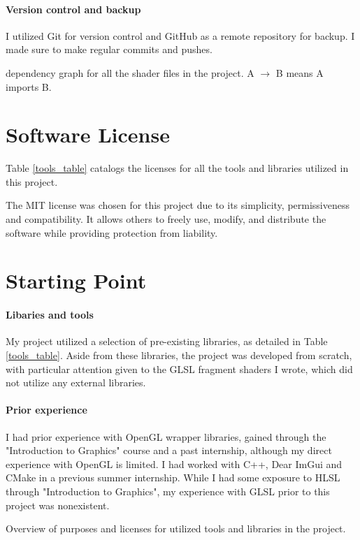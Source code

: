 \paragraph{Version control and backup}
I utilized Git for version control and GitHub as a remote repository for backup. I made sure to make regular commits and pushes.

{dependency graph for all the shader files in the project. A $\rightarrow$ B means A imports B.}

\section{Software License}
\label{sec:License}

Table \ref{tools_table} catalogs the licenses for all the tools and libraries utilized in this project.

The MIT license was chosen for this project due to its simplicity, permissiveness and compatibility. It allows others to freely use, modify, and distribute the software while providing protection from liability.


\section{Starting Point}
\label{sec:Starting Point}

\paragraph{Libaries and tools}
My project utilized a selection of pre-existing libraries, as detailed in Table \ref{tools_table}. Aside from these libraries, the project was developed from scratch, with particular attention given to the GLSL fragment shaders I wrote, which did not utilize any external libraries.

\paragraph{Prior experience}
I had prior experience with OpenGL wrapper libraries, gained through the "Introduction to Graphics" course and a past internship, although my direct experience with OpenGL is limited. I had worked with C++, Dear ImGui and CMake in a previous summer internship. While I had some exposure to HLSL through "Introduction to Graphics", my experience with GLSL prior to this project was nonexistent.

{Overview of purposes and licenses for utilized tools and libraries in the project.}